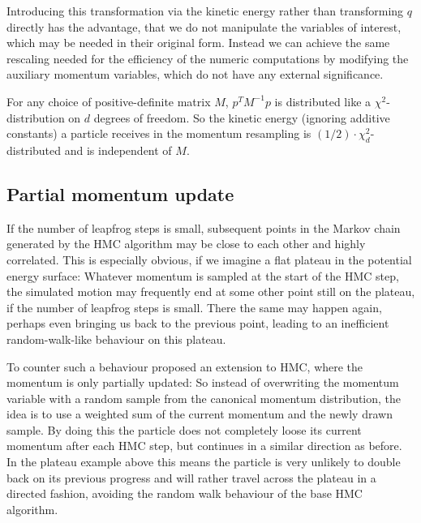 Introducing this transformation via the kinetic energy rather than transforming $q$ directly has the advantage, that we do not manipulate the variables of interest, which may be needed in their original form. Instead we can achieve the same rescaling needed for the efficiency of the numeric computations by modifying the auxiliary momentum variables, which do not have any external significance.

For any choice of positive-definite matrix $M$, $p^T M^{-1} p$ is distributed like a $\chi^2$-distribution on $d$ degrees of freedom. So the kinetic energy (ignoring additive constants) a particle receives in the momentum resampling is $(1/2) \cdot \chi^2_d$-distributed and is independent of $M$.

\subsection{Partial momentum update}
\label{sec:PartialMomentumUpdate}
If the number of leapfrog steps is small, subsequent points in the Markov chain generated by the HMC algorithm may be close to each other and highly correlated. This is especially obvious, if we imagine a flat plateau in the potential energy surface: Whatever momentum is sampled at the start of the HMC step, the simulated motion may frequently end at some other point still on the plateau, if the number of leapfrog steps is small. There the same may happen again, perhaps even bringing us back to the previous point, leading to an inefficient random-walk-like behaviour on this plateau.

To counter such a behaviour \parencite{Horowitz1991} proposed an extension to HMC, where the momentum is only partially updated: So instead of overwriting the momentum variable with a random sample from the canonical momentum distribution, the idea is to use a weighted sum of the current momentum and the newly drawn sample. By doing this the particle does not completely loose its current momentum after each HMC step, but continues in a similar direction as before. In the plateau example above this means the particle is very unlikely to double back on its previous progress and will rather travel across the plateau in a directed fashion, avoiding the random walk behaviour of the base HMC algorithm.

